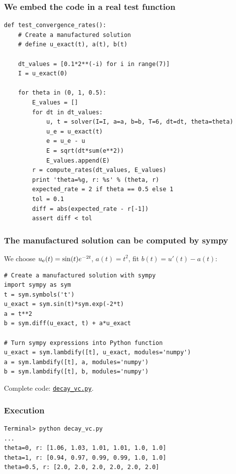 \documentclass{beamer}
\begin{document}
\begin{frame}
\frametitle{We embed the code in a real test function}

\begin{verbatim}
def test_convergence_rates():
    # Create a manufactured solution
    # define u_exact(t), a(t), b(t)

    dt_values = [0.1*2**(-i) for i in range(7)]
    I = u_exact(0)

    for theta in (0, 1, 0.5):
        E_values = []
        for dt in dt_values:
            u, t = solver(I=I, a=a, b=b, T=6, dt=dt, theta=theta)
            u_e = u_exact(t)
            e = u_e - u
            E = sqrt(dt*sum(e**2))
            E_values.append(E)
        r = compute_rates(dt_values, E_values)
        print 'theta=%g, r: %s' % (theta, r)
        expected_rate = 2 if theta == 0.5 else 1
        tol = 0.1
        diff = abs(expected_rate - r[-1])
        assert diff < tol
\end{verbatim}
\end{frame}

\begin{frame}
\frametitle{The manufactured solution can be computed by sympy}

We choose $\uex(t) = \sin(t)e^{-2t}$, $a(t)=t^2$, fit $b(t)=u'(t)-a(t)$:

\begin{verbatim}
# Create a manufactured solution with sympy
import sympy as sym
t = sym.symbols('t')
u_exact = sym.sin(t)*sym.exp(-2*t)
a = t**2
b = sym.diff(u_exact, t) + a*u_exact

# Turn sympy expressions into Python function
u_exact = sym.lambdify([t], u_exact, modules='numpy')
a = sym.lambdify([t], a, modules='numpy')
b = sym.lambdify([t], b, modules='numpy')
\end{verbatim}

Complete code: \href{{http://tinyurl.com/ofkw6kc/genz/decay_vc.py}}{\nolinkurl{decay_vc.py}}.
\end{frame}

\begin{frame}
\frametitle{Execution}

\begin{verbatim}
Terminal> python decay_vc.py
...
theta=0, r: [1.06, 1.03, 1.01, 1.01, 1.0, 1.0]
theta=1, r: [0.94, 0.97, 0.99, 0.99, 1.0, 1.0]
theta=0.5, r: [2.0, 2.0, 2.0, 2.0, 2.0, 2.0]
\end{verbatim}
\end{frame}
\end{document}
